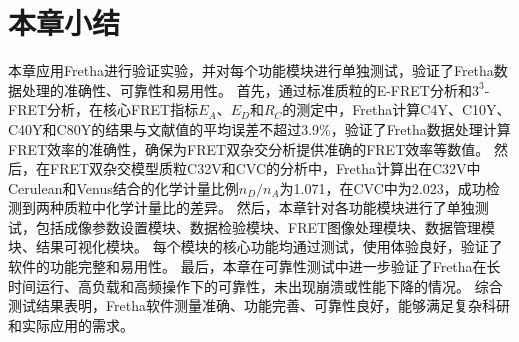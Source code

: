 \section{本章小结}
本章应用Fretha进行验证实验，并对每个功能模块进行单独测试，验证了Fretha数据处理的准确性、可靠性和易用性。
首先，通过标准质粒的E-FRET分析和$3^3$-FRET分析，在核心FRET指标$E_A$、$E_D$和$R_C$的测定中，Fretha计算C4Y、C10Y、C40Y和C80Y的结果与文献值的平均误差不超过3.9\%，验证了Fretha数据处理计算FRET效率的准确性，确保为FRET双杂交分析提供准确的FRET效率等数值。
然后，在FRET双杂交模型质粒C32V和CVC的分析中，Fretha计算出在C32V中Cerulean和Venus结合的化学计量比例$n_D/n_A$为1.071，在CVC中为2.023，成功检测到两种质粒中化学计量比的差异。
然后，本章针对各功能模块进行了单独测试，包括成像参数设置模块、数据检验模块、FRET图像处理模块、数据管理模块、结果可视化模块。
每个模块的核心功能均通过测试，使用体验良好，验证了软件的功能完整和易用性。
最后，本章在可靠性测试中进一步验证了Fretha在长时间运行、高负载和高频操作下的可靠性，未出现崩溃或性能下降的情况。
综合测试结果表明，Fretha软件测量准确、功能完善、可靠性良好，能够满足复杂科研和实际应用的需求。